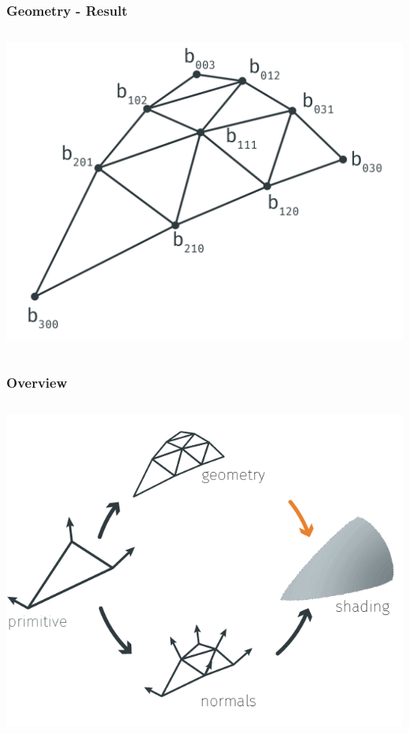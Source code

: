 \begin{frame}\frametitle{Geometry - Result}
	\begin{columns}
		\begin{column}{0.6\textwidth}
			\begin{center}
			\includegraphics[width=\textwidth]{img/1_single/geometry_4.png}
			\end{center}	
		\end{column}
	\end{columns}
\end{frame}

\begin{frame}\frametitle{Overview}
	\begin{columns}
		\begin{column}{0.9\textwidth}
			\begin{center}
				\includegraphics[width=\textwidth]{./img/1_single/recap_geomToShading.png}
			\end{center}		
		\end{column}
	\end{columns}
\end{frame}	

